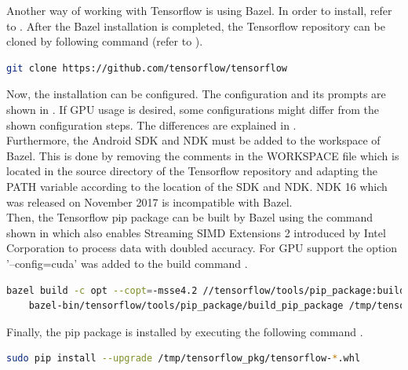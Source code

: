 Another way of working with Tensorflow is using Bazel. In order to install, refer to . 
After the Bazel installation is completed, the Tensorflow repository can be cloned by following command (refer to ).

\begin{lstlisting}[caption=Cloning the tensorflow repository, label=list:clone_tensorflow, language=bash]
	git clone https://github.com/tensorflow/tensorflow		
\end{lstlisting}

Now, the installation can be configured. The configuration and its prompts are shown in . If GPU usage is desired, some configurations might differ from the shown configuration steps. The differences are explained in .\\

Furthermore, the Android SDK and NDK must be added to the workspace of Bazel. This is done by removing the comments in the WORKSPACE file which is located in the source directory of the Tensorflow repository and adapting the PATH variable according to the location of the SDK and NDK. NDK 16 which was released on November 2017 is incompatible with Bazel. \\

Then, the Tensorflow pip package can be built by Bazel using the command shown in  which also enables Streaming SIMD Extensions 2 introduced by Intel Corporation to process data with doubled accuracy. For GPU support the option '--config=cuda' was added to the build command \citep{GithubBazel}.

\begin{lstlisting}[caption=Building the Tensorflow pip package, label=list:pip_package, language=bash]
	bazel build -c opt --copt=-msse4.2 //tensorflow/tools/pip_package:build_pip_package
	bazel-bin/tensorflow/tools/pip_package/build_pip_package /tmp/tensorflow_pkg
\end{lstlisting}

Finally, the pip package is installed by executing the following command .

\begin{lstlisting}[caption=Installing the pip package, label=list:pip_install, language=bash]
	sudo pip install --upgrade /tmp/tensorflow_pkg/tensorflow-*.whl
\end{lstlisting}

